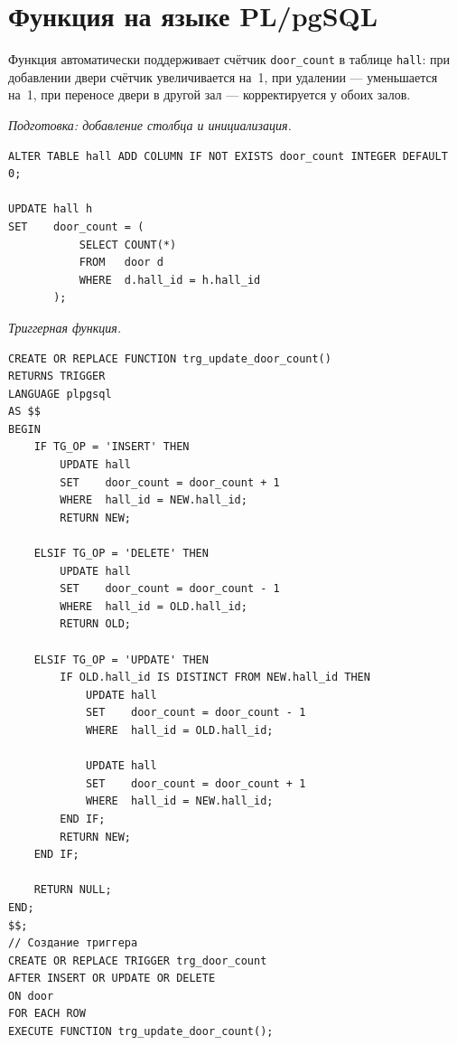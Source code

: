 \documentclass[12pt,a4paper]{article}
\begin{document}
\section{Функция на языке PL/pgSQL}

Функция автоматически поддерживает счётчик \texttt{door\_count} в таблице
\texttt{hall}: при добавлении двери счётчик увеличивается на~1, при
удалении --- уменьшается на~1, при переносе двери в другой зал ---
корректируется у обоих залов.

\vspace{4pt}
\noindent\textit{Подготовка: добавление столбца и инициализация.}

\begin{lstlisting}
ALTER TABLE hall ADD COLUMN IF NOT EXISTS door_count INTEGER DEFAULT 0;

UPDATE hall h
SET    door_count = (
           SELECT COUNT(*)
           FROM   door d
           WHERE  d.hall_id = h.hall_id
       );
\end{lstlisting}

\noindent\textit{Триггерная функция.}

\begin{lstlisting}
CREATE OR REPLACE FUNCTION trg_update_door_count()
RETURNS TRIGGER
LANGUAGE plpgsql
AS $$
BEGIN
    IF TG_OP = 'INSERT' THEN
        UPDATE hall
        SET    door_count = door_count + 1
        WHERE  hall_id = NEW.hall_id;
        RETURN NEW;

    ELSIF TG_OP = 'DELETE' THEN
        UPDATE hall
        SET    door_count = door_count - 1
        WHERE  hall_id = OLD.hall_id;
        RETURN OLD;

    ELSIF TG_OP = 'UPDATE' THEN
        IF OLD.hall_id IS DISTINCT FROM NEW.hall_id THEN
            UPDATE hall
            SET    door_count = door_count - 1
            WHERE  hall_id = OLD.hall_id;

            UPDATE hall
            SET    door_count = door_count + 1
            WHERE  hall_id = NEW.hall_id;
        END IF;
        RETURN NEW;
    END IF;

    RETURN NULL;
END;
$$;
// Создание триггера
CREATE OR REPLACE TRIGGER trg_door_count
AFTER INSERT OR UPDATE OR DELETE
ON door
FOR EACH ROW
EXECUTE FUNCTION trg_update_door_count();
\end{lstlisting}

\end{document}
